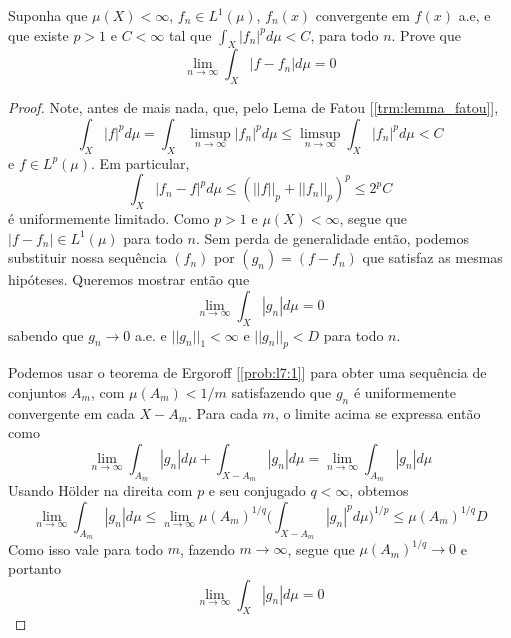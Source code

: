 \begin{problem}
    \label{prob:l7:2}
    Suponha que $\mu(X) < \infty$, $f_n \in L^1(\mu)$, $f_n(x)$ convergente em $f(x)$ a.e, e que existe 
    $p > 1$ e $C < \infty$ tal que $\int_X|f_n|^p d\mu < C$, para todo $n$. Prove que 
    $$\lim_{n\to\infty} \int_X |f - f_n|d\mu = 0$$ 
\end{problem}
\begin{proof}
    Note, antes de mais nada, que, pelo Lema de Fatou [\ref{trm:lemma_fatou}],
    $$\int_X |f|^p d\mu = \int_X \limsup_{n\to\infty} |f_n|^p d\mu \leq \limsup_{n\to\infty} \int_X |f_n|^p d\mu < C$$
    e $f \in L^p(\mu)$.
    Em particular,
    $$\int_{X} |f_n - f|^p d\mu \leq (||f||_p + ||f_n||_p)^p \leq 2^pC$$
    é uniformemente limitado. Como $p > 1$ e $\mu(X) < \infty$, segue que $|f - f_n| \in L^1(\mu)$ para todo $n$.
    Sem perda de generalidade então, podemos substituir nossa sequência $(f_n)$ por $(g_n) = (f - f_n)$ que satisfaz
    as mesmas hipóteses. Queremos mostrar então que 
    $$\lim_{n\to\infty} \int_{X} |g_n| d\mu = 0$$
    sabendo que $g_n \to 0$ a.e. e $||g_n||_1 < \infty$ e $||g_n||_p < D$ para todo $n$. 
    
    Podemos usar o teorema de Ergoroff [\ref{prob:l7:1}]
    para obter uma sequência de conjuntos $A_m$, com $\mu(A_m) < 1/m$ satisfazendo que $g_n$ é uniformemente convergente em cada $X - A_m$.
    Para cada $m$, o limite acima se expressa então como 
    $$\lim_{n\to\infty}\int_{A_m} |g_n|d\mu + \int_{X - A_m} |g_n|d\mu = \lim_{n\to\infty}\int_{A_m} |g_n|d\mu$$
    Usando Hölder na direita com $p$ e seu conjugado $q < \infty$, obtemos 
    $$\lim_{n\to\infty}\int_{A_m} |g_n|d\mu \leq \lim_{n\to\infty} \mu(A_m)^{1/q}\bigg(\int_{X - A_m} |g_n|^p d\mu\bigg)^{1/p} \leq \mu(A_m)^{1/q}D$$
    Como isso vale para todo $m$, fazendo $m \to \infty$, segue que $\mu(A_m)^{1/q} \to 0$ e portanto 
    $$\lim_{n\to\infty} \int_{X} |g_n| d\mu = 0$$
\end{proof}

